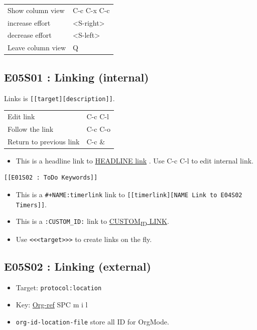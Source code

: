 \documentclass[11pt]{article}
\begin{document}
\begin{center}
\begin{tabular}{ll}
Show column view &  C-c C-x C-c \\
increase effort &  <S-right> \\
decrease effort &  <S-left> \\
Leave column view &  Q \\
\end{tabular}
\end{center}

\subsection{E05S01 : Linking (internal)}
\label{sec:orgb6c39a4}
Links is \texttt{[[target][description]]}. 

\begin{center}
\begin{tabular}{ll}
Edit link &  C-c C-l \\
Follow the link &  C-c C-o \\
Return to previous link &  C-c \& \\
\end{tabular}
\end{center}

\begin{itemize}
\item This is a headline link to \hyperref[sec:org941acfc]{HEADLINE link} . Use  C-c
C-l  to edit internal link.
\end{itemize}
\begin{verbatim}
[[E01S02 : ToDo Keywords]]
\end{verbatim}
\begin{itemize}
\item This is a \texttt{\#+NAME:timerlink} link to \texttt{[[timerlink][NAME Link to E04S02 Timers]]}.
\item This is a \texttt{:CUSTOM\_ID:} link to \hyperref[sec:orgca57c70]{CUSTOM\textsubscript{ID} LINK}.
\item Use \texttt{<<<target>>>} to create links on the fly.
\end{itemize}
\subsection{E05S02 : Linking (external)}
\label{sec:org0724007}
\begin{itemize}
\item Target: \texttt{protocol:location}
\item Key: \href{https://github.com/jkitchin/org-ref}{Org-ref}  SPC m i l
\item \texttt{org-id-location-file} store all ID for OrgMode.
\end{itemize}
\end{document}
